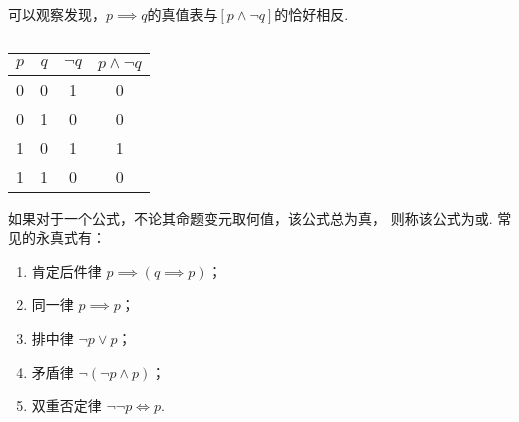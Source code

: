 可以观察发现，\(p \implies q\)的真值表与\([p \land \neg q]\)的恰好相反.
\begin{table}[ht]
	\centering
	\begin{tabular}{|*4{c|}}
		\hline
		\(p\) & \(q\) & \(\neg q\) & \(p \land \neg q\) \\ \hline
		0 & 0 & 1 & 0 \\ \hline
		0 & 1 & 0 & 0 \\ \hline
		1 & 0 & 1 & 1 \\ \hline
		1 & 1 & 0 & 0 \\ \hline
	\end{tabular}
	\caption{}
\end{table}



如果对于一个公式，不论其命题变元取何值，该公式总为真，
则称该公式为或.
常见的永真式有：
\begin{enumerate}
	\item 肯定后件律 \(p \implies (q \implies p)\)；
	\item 同一律 \(p \implies p\)；
	\item 排中律 \(\neg p \lor p\)；
	\item 矛盾律 \(\neg(\neg p \land p)\)；
	\item 双重否定律 \(\neg\neg p \iff p\).
\end{enumerate}


